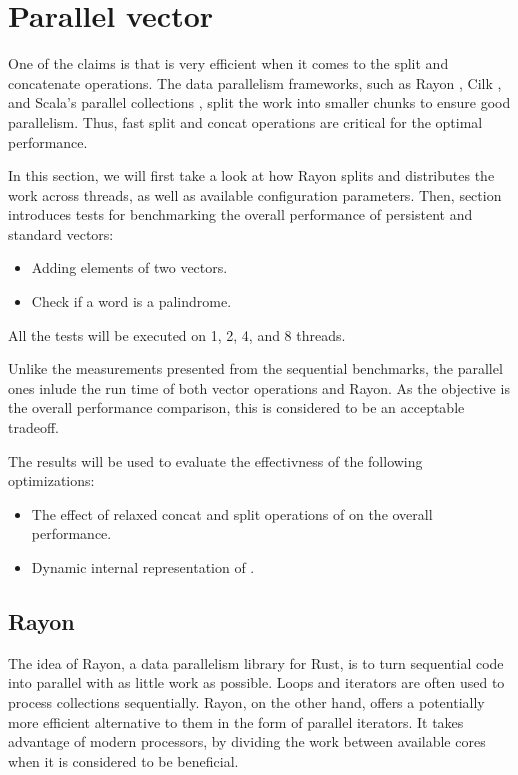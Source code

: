 \section{Parallel vector}
One of the claims is that \rrbvec{} is very efficient when it comes to the split and concatenate operations. The data parallelism frameworks, such as Rayon , Cilk , and Scala's parallel collections , split the work into smaller chunks to ensure good parallelism. Thus, fast split and concat operations are critical for the optimal performance. 

In this section, we will first take a look at how Rayon splits and distributes the work across threads, as well as available configuration parameters. Then, section \todo{} introduces tests for benchmarking the overall performance of persistent and standard vectors:

\begin{itemize}    
    \item Adding elements of two vectors.    
    \item Check if a word is a palindrome.         
\end{itemize}

All the tests will be executed on 1, 2, 4, and 8 threads. 

Unlike the measurements presented from the sequential benchmarks, the parallel ones inlude the run time of both vector operations and Rayon. As the objective is the overall performance comparison, this is considered to be an acceptable tradeoff. 

The results will be used to evaluate the effectivness of the following optimizations:
\begin{itemize}
    \item The effect of relaxed concat and split operations of \rrbvec{} on the overall performance. 
    \item Dynamic internal representation of \pvec{}.     
\end{itemize}

\subsection{Rayon}
The idea of Rayon, a data parallelism library for Rust, is to turn sequential code into parallel with as little work as possible. Loops and iterators are often used to process collections sequentially. Rayon, on the other hand, offers a potentially more efficient alternative to them in the form of parallel iterators. It takes advantage of modern processors, by dividing the work between available cores when it is considered to be beneficial. 

